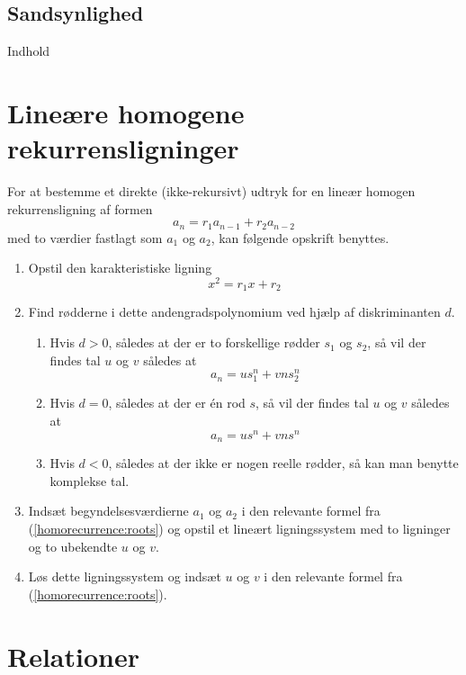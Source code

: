 \documentclass[a4paper]{article}
\begin{document}
\subsection{Sandsynlighed}
Indhold

\section{Lineære homogene rekurrensligninger}

For at bestemme et direkte (ikke-rekursivt) udtryk for en lineær homogen rekurrensligning
af formen $$a_n = r_1a_{n - 1} + r_2a_{n - 2}$$ med to værdier fastlagt som $a_1$ og $a_2$,
kan følgende opskrift benyttes.

\begin{enumerate}

\item Opstil den karakteristiske ligning $$x^2 = r_1x + r_2$$

\item Find rødderne i dette andengradspolynomium ved hjælp af diskriminanten $d$.
\label{homorecurrence:roots}

\begin{enumerate}
\item Hvis $d > 0$, således at der er to forskellige rødder $s_1$ og $s_2$, så vil der
findes tal $u$ og $v$ således at $$a_n = us_1^n + vns_2^n$$

\item Hvis $d = 0$, således at der er én rod $s$, så vil der findes tal $u$ og $v$ således
at $$a_n = us^n + vns^n$$

\item Hvis $d < 0$, således at der ikke er nogen reelle rødder, så kan man benytte komplekse
tal.
\end{enumerate}

\item Indsæt begyndelsesværdierne $a_1$ og $a_2$ i den relevante formel fra (\ref{homorecurrence:roots})
og opstil et lineært ligningssystem med to ligninger og to ubekendte $u$ og $v$.

\item Løs dette ligningssystem og indsæt $u$ og $v$ i den relevante formel fra
(\ref{homorecurrence:roots}).

\end{enumerate}

\section{Relationer}
\end{document}

